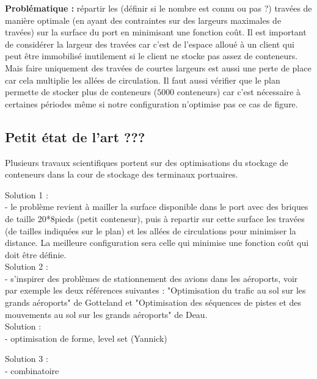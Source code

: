 \documentclass{article}
\begin{document}
\noindent
{\bf Problématique :} répartir les (définir si le nombre est connu ou pas ?) travées de manière optimale (en ayant des contraintes sur des largeurs maximales de travées) sur la surface du port en minimisant une fonction coût. Il est important de considérer la largeur des travées car c'est de l'espace alloué à un client qui peut être immobilisé inutilement si le client ne stocke pas assez de conteneurs. Mais faire uniquement des travées de courtes largeurs est aussi une perte de place car cela multiplie les allées de circulation. Il faut aussi vérifier que le plan permette de stocker plus de conteneurs ($5000$ conteneurs) car c'est nécessaire à certaines périodes même si notre configuration n'optimise pas ce cas de figure. \\


\subsection{Petit état de l'art ???}
Plusieurs travaux scientifiques portent sur des optimisations du stockage de conteneurs dans la cour de stockage des terminaux portuaires.




Solution 1 : \\
- le problème revient à mailler la surface disponible dans le port avec des briques de taille 20*8pieds (petit conteneur), puis à repartir sur cette surface les travées (de tailles indiquées sur le plan) et les allées de circulations pour minimiser la distance. La meilleure configuration sera celle qui minimise une fonction coût qui doit être définie.  \\


Solution 2 : \\
- s'inspirer des problèmes de stationnement des avions dans les aéroports, voir par exemple les deux références suivantes : "Optimisation du trafic au sol sur les grands aéroports" de Gotteland et "Optimisation des séquences de pistes et des mouvements au sol sur les grands aéroports" de Deau. \\

Solution : \\
- optimisation de forme, level set (Yannick)

Solution 3 : \\
- combinatoire\\
\end{document}
